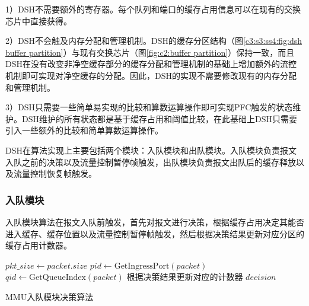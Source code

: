 1）DSH不需要额外的寄存器。每个队列和端口的缓存占用信息可以在现有的交换芯片中直接获得。

2）DSH不会触及内存分配和管理机制。DSH的缓存分区结构（图\ref{c3:s3:ss4:fig:dsh buffer partition}）与现有交换芯片（图\ref{fig:c2:buffer partition}）保持一致，而且DSH在没有改变非净空缓存部分的缓存分配和管理机制的基础上增加额外的流控机制即可实现对净空缓存的分配。因此，DSH的实现不需要修改现有的内存分配和管理机制。

3）DSH只需要一些简单易实现的比较和算数运算操作即可实现PFC触发的状态维护。DSH维护的所有状态都是基于缓存占用和阈值比较，在此基础上DSH只需要引入一些额外的比较和简单算数运算操作。

DSH在算法实现上主要包括两个模块：入队模块和出队模块。入队模块负责报文入队之前的决策以及流量控制暂停帧触发，出队模块负责报文出队后的缓存释放以及流量控制恢复帧触发。

\subsubsection{入队模块}
入队模块算法在报文入队前触发，首先对报文进行决策，根据缓存占用决定其能否进入缓存、缓存位置以及流量控制暂停帧触发，然后根据决策结果更新对应分区的缓存占用计数器。

\begin{algorithm}[H]
  \small
  \SetAlCapFnt{\small}
  \SetAlCapNameFnt{\small}

  \SetAlgoVlined

  $pkt\_size \leftarrow packet.size$\;
  $pid \leftarrow \text{GetIngressPort}(packet)$\;
  $qid \leftarrow \text{GetQueueIndex}(packet)$\;
  根据决策结果更新对应的计数器\;
  \Return $decision$\;
  \caption{MMU入队模块决策算法}
  \label{alg:c3:s5:ss5:enqueue module algorithm}
\end{algorithm}

